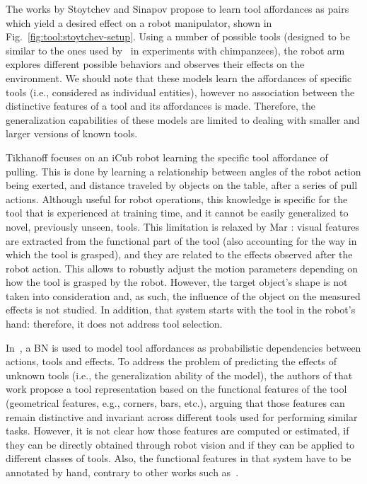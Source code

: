 The works by Stoytchev and Sinapov \cite{stoytchev:2005:icra,sinapov:2007:icdl,stoytchev:2008:lnai} propose to learn tool affordances as
\toolbehavior{} pairs which yield a desired effect on a robot manipulator, shown in Fig.~\ref{fig:tool:stoytchev-setup}.
Using a number of possible tools (designed to be similar to the ones used by~\cite{kohler:mentality_of_apes} in experiments with chimpanzees), the robot arm explores different possible behaviors and observes their effects on the environment.
We should note that these models learn the affordances of specific tools (i.e., considered as individual entities), however no association between the distinctive features of a tool and its affordances is made.
Therefore, the generalization capabilities of these models are limited to dealing with smaller and larger versions of known tools.

Tikhanoff \cite{tikhanoff:2013:humanoids} focuses on an iCub robot learning the specific tool affordance of pulling.
This is done by learning a relationship between angles of the robot action being exerted, and distance traveled by objects on the table, after a series of pull actions.
Although useful for robot operations, this knowledge is specific for the tool that is experienced at training time, and it cannot be easily generalized to novel, previously unseen, tools.
This limitation is relaxed by Mar \cite{mar:2018:tcds}: visual features are extracted from the functional part of the tool (also accounting for the way in which the tool is grasped), and they are related to the effects observed after the robot action.
This allows to robustly adjust the motion parameters depending on how the tool is grasped by the robot.
However, the target object's shape is not taken into consideration and, as such, the influence of the object on the measured effects is not studied.
In addition, that system starts with the tool in the robot's hand: therefore, it does not address tool selection.

In~\cite{jain:2013:alr}, a \ac{BN} is used to model tool affordances as probabilistic dependencies between actions, tools and effects.
To address the problem of predicting the effects of unknown tools (i.e., the generalization ability of the model), the authors of that work propose a tool representation based on the functional features of the tool (geometrical features, e.g., corners, bars, etc.), arguing that those features can remain distinctive and invariant across different tools used for performing similar tasks.
However, it is not clear how those features are computed or estimated, if they can be directly obtained through robot vision and if they can be applied to different classes of tools.
Also, the functional features in that system have to be annotated by hand, contrary to other works such as~\cite{mar:2018:tcds}.

